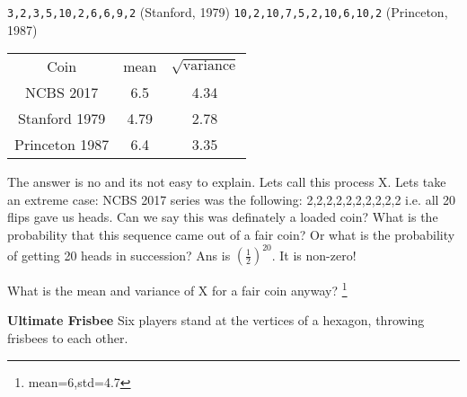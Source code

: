 \documentclass[a4paper,9pt, addpoints, solutions]{exam}
\begin{document}
\begin{questions}
\verb|3,2,3,5,10,2,6,6,9,2|     (Stanford, 1979)
\verb|10,2,10,7,5,2,10,6,10,2|  (Princeton, 1987)


\begin{solution}
\begin{tabular}{c c  c}
 Coin         & mean & $\sqrt{\text{variance}}$ \\
NCBS 2017     & 6.5  & 4.34  \\
Stanford 1979 & 4.79 & 2.78  \\
Princeton 1987& 6.4  & 3.35  \\
\end{tabular}

The answer is no and its not easy to explain.
Lets call this process X. Lets take an extreme case: NCBS 2017 series was the
following: 2,2,2,2,2,2,2,2,2,2 i.e. all 20 flips gave us heads. Can we say this
was definately a loaded coin? What is the probability that this sequence came
out of a fair coin? Or what is the probability of getting 20 heads in
succession? Ans is $(\frac{1}{2})^{20}$. It is non-zero!

What is the mean and variance of X for a fair coin anyway?  \footnote{mean=6,std=4.7}
\end{solution} 

\question[10] \textbf{Ultimate Frisbee} 
Six players stand at the vertices of a hexagon, throwing frisbees to each other.

\end{questions}
\end{document}
